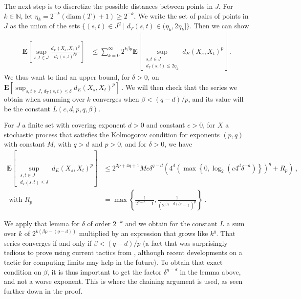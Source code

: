 \documentclass[lean]{Draft}
\makeatletter
\newcommand\leanlink{\begingroup\catcode`\#=12\relax\@leanlink}
\newcommand\@leanlink[2]{\endgroup
\href{#1}
{\texttt{\detokenize{#2}}}}
\newcommand{\bmlink}[3]{%
\leanlink{https://github.com/RemyDegenne/brownian-motion/blob/8fd8dc52830cdd07cf9cc8eadd533e284425fa6f/BrownianMotion/#1.lean\##2}
{#3}}
\makeatother
\begin{document}
The next step is to discretize the possible distances between points in $J$.
For $k \in \mathbb{N}$, let $\eta_k = 2^{-k}(\mathrm{diam}(T) + 1) \ge 2^{-k}$.
We write the set of pairs of points in $J$ as the union of the sets $\{(s, t) \in J^2 \mid d_T(s, t) \in (\eta_k, 2\eta_k]\}$.
Then we can show
\begin{align*}
  \mathbf{E}\left[ \sup_{s, t \in J} \frac{d_E(X_s, X_t)^p}{d_T(s, t)^{\beta p}} \right]
  &\le \sum_{k=0}^\infty 2^{k \beta p} \mathbf{E}\left[ \sup_{\substack{s, t \in J \\ d_T(s, t) \le 2\eta_k}} d_E(X_s, X_t)^p \right]
  \: .
\end{align*}
We thus want to find an upper bound, for $\delta > 0$, on
$
  \mathbf{E}\left[ \sup_{s, t \in J,\: d_T(s, t) \le \delta} d_E(X_s, X_t)^p \right]
  \: .
$
We will then check that the series we obtain when summing over $k$ converges when $\beta < (q - d)/p$, and its value will be the constant $L(c, d, p, q, \beta)$.

\begin{lemma}[\bmlink{Continuity/IsKolmogorovProcess}{L1007-L1013}{ProbabilityTheory.finite_set_bound_of_edist_le}]\label{lem:finite_set_bound_of_dist_le}
For $J$ a finite set with covering exponent $d > 0$ and constant $c > 0$, for $X$ a stochastic process that satisfies the Kolmogorov condition for exponents $(p, q)$ with constant $M$, with $q > d$ and $p > 0$, and for $\delta > 0$, we have
\begin{align*}
  \mathbf{E}\left[ \sup_{\substack{s, t \in J \\ d_T(s, t) \le \delta}} d_E(X_s, X_t)^p \right]
  &\le 2^{2p+4q+1} M c \delta^{q-d}\left( 4^d \left(\max\left\{0, \log_2 \left(c 4^d \delta^{-d}\right)\right\}\right)^q + R_p \right)
  \: ,
  \\
  \text{ with } R_p
  &= \max\left\{\frac{1}{2^{q-d} - 1}, \frac{1}{(2^{(q-d)/p} - 1)^p}\right\}
  \: .
\end{align*}
\end{lemma}

We apply that lemma for $\delta$ of order $2^{-k}$ and we obtain for the constant $L$ a sum over $k$ of $2^{k(\beta p - (q - d))}$ multiplied by an expression that grows like $k^q$.
That series converges if and only if $\beta < (q - d)/p$ (a fact that was surprisingly tedious to prove using current tactics from \mathlib, although recent developments on a tactic for computing limits may help in the future).
To obtain that exact condition on $\beta$, it is thus important to get the factor $\delta^{q-d}$ in the lemma above, and not a worse exponent.
This is where the chaining argument is used, as seen further down in the proof.
\end{document}
